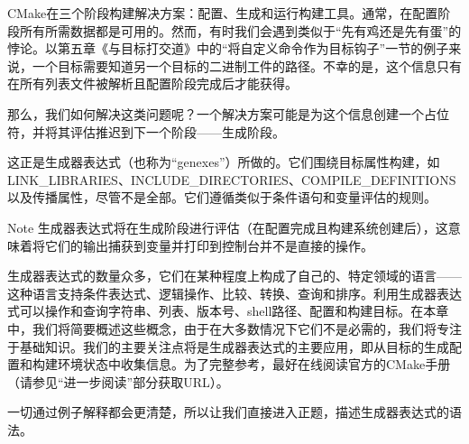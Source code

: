 

CMake在三个阶段构建解决方案：配置、生成和运行构建工具。通常，在配置阶段所有所需数据都是可用的。然而，有时我们会遇到类似于“先有鸡还是先有蛋”的悖论。以第五章《与目标打交道》中的“将自定义命令作为目标钩子”一节的例子来说，一个目标需要知道另一个目标的二进制工件的路径。不幸的是，这个信息只有在所有列表文件被解析且配置阶段完成后才能获得。

那么，我们如何解决这类问题呢？一个解决方案可能是为这个信息创建一个占位符，并将其评估推迟到下一个阶段——生成阶段。

这正是生成器表达式（也称为“genexes”）所做的。它们围绕目标属性构建，如LINK\_LIBRARIES、INCLUDE\_DIRECTORIES、COMPILE\_DEFINITIONS以及传播属性，尽管不是全部。它们遵循类似于条件语句和变量评估的规则。

\begin{myNotic}{Note}
生成器表达式将在生成阶段进行评估（在配置完成且构建系统创建后），这意味着将它们的输出捕获到变量并打印到控制台并不是直接的操作。
\end{myNotic}

生成器表达式的数量众多，它们在某种程度上构成了自己的、特定领域的语言——这种语言支持条件表达式、逻辑操作、比较、转换、查询和排序。利用生成器表达式可以操作和查询字符串、列表、版本号、shell路径、配置和构建目标。在本章中，我们将简要概述这些概念，由于在大多数情况下它们不是必需的，我们将专注于基础知识。我们的主要关注点将是生成器表达式的主要应用，即从目标的生成配置和构建环境状态中收集信息。为了完整参考，最好在线阅读官方的CMake手册（请参见“进一步阅读”部分获取URL）。

一切通过例子解释都会更清楚，所以让我们直接进入正题，描述生成器表达式的语法。















